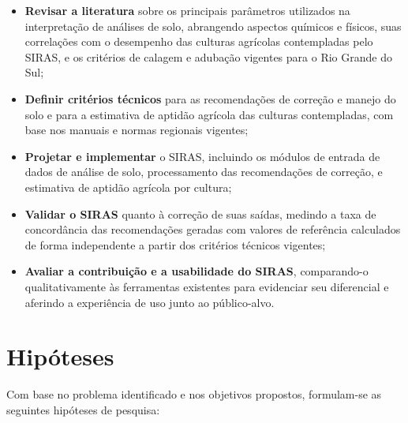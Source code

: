 \begin{itemize}[leftmargin=5em]

  \item \textbf{Revisar a literatura} sobre os principais parâmetros utilizados
    na interpretação de análises de solo, abrangendo aspectos químicos e físicos,
    suas correlações com o desempenho das culturas agrícolas contempladas pelo
    SIRAS, e os critérios de calagem e adubação vigentes para o Rio Grande do Sul;

  \item \textbf{Definir critérios técnicos} para as recomendações de correção
    e manejo do solo e para a estimativa de aptidão agrícola das culturas
    contempladas, com base nos manuais e normas regionais vigentes;

  \item \textbf{Projetar e implementar} o SIRAS, incluindo os módulos de
    entrada de dados de análise de solo, processamento das recomendações
    de correção, e estimativa de aptidão agrícola por cultura;

  \item \textbf{Validar o SIRAS} quanto à correção de suas saídas, medindo
    a taxa de concordância das recomendações geradas com valores de
    referência calculados de forma independente a partir dos critérios
    técnicos vigentes;

  \item \textbf{Avaliar a contribuição e a usabilidade do SIRAS}, comparando-o
    qualitativamente às ferramentas existentes para evidenciar seu diferencial
    e aferindo a experiência de uso junto ao público-alvo.

\end{itemize}

\section{Hipóteses}\label{sec:hipoteses}

Com base no problema identificado e nos objetivos propostos,
formulam-se as seguintes hipóteses de pesquisa:

